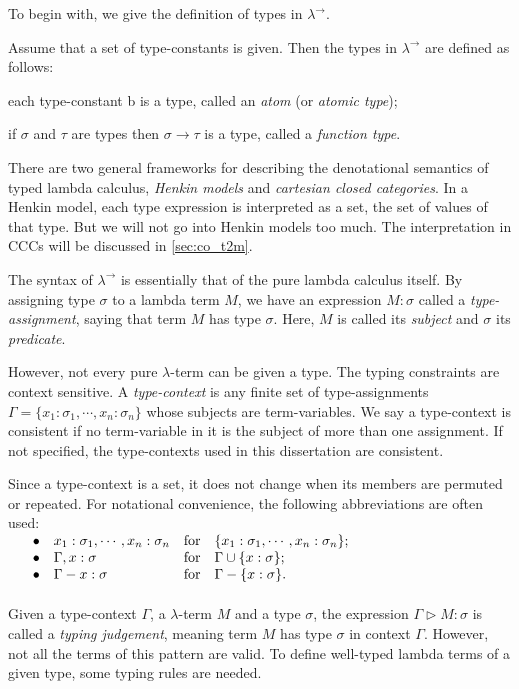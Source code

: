 To begin with, we give the definition of types in $ \lambda ^\to $.
\begin{definition}
\label{definition:types}
Assume that a set of type-constants is given. Then the types in $ \lambda ^\to $ are defined as follows:
\begin{myitemize}
\item each type-constant b is a type, called an \emph{atom} (or \emph{atomic type});
\item if $ \sigma $ and $ \tau $ are types then $ \sigma \to \tau $ is a type, called a \emph{function type}.
\end{myitemize}
\end{definition}

There are two general frameworks for describing the denotational semantics of typed lambda calculus, \emph{Henkin models} and \emph{cartesian closed categories}. In a Henkin model, each type expression is interpreted as a set, the set of values of that type. But we will not go into Henkin models too much. The interpretation in CCCs will be discussed in \ref{sec:co_t2m}.

The syntax of $ \lambda ^\to $ is essentially that of the pure lambda calculus itself. By assigning type $ \sigma $ to a lambda term $ M $, we have an expression $ M:\sigma $ called a \emph{type-assignment}, saying that term $ M $ has type $ \sigma $. Here, $ M $ is called its \emph{subject} and $ \sigma $ its \emph{predicate}.

However, not every pure $ \lambda $-term can be given a type. The typing constraints are context sensitive. A \emph{type-context} is any finite set of type-assignments $ \Gamma = \{ x_1 : \sigma _1 , \cdots , x_n : \sigma _n \} $ whose subjects are term-variables. We say a type-context is consistent if no term-variable in it is the subject of more than one assignment. If not specified, the type-contexts used in this dissertation are consistent.

Since a type-context is a set, it does not change when its members are permuted or repeated. For notational convenience, the following abbreviations are often used:\\
$
\begin{array}{rlll}
\hspace*{12pt} \bullet & x_1 : \sigma _1 , \cdots , x_n : \sigma _n & \text{for} & \{ x_1 : \sigma _1 , \cdots , x_n : \sigma _n \} ; \\
\bullet & \Gamma , x : \sigma & \text{for} & \Gamma \cup \{ x : \sigma \} ; \\
\bullet & \Gamma - x : \sigma & \text{for} & \Gamma - \{ x : \sigma \} .
\end{array}
$
\\
\\
Given a type-context $ \Gamma $, a $ \lambda $-term $ M $ and a type $ \sigma $, the expression $ \Gamma \triangleright M: \sigma $ is called a \emph{typing judgement}, meaning term $ M $ has type $ \sigma $ in context $ \Gamma $. However, not all the terms of this pattern are valid. To define well-typed lambda terms of a given type, some typing rules are needed.

